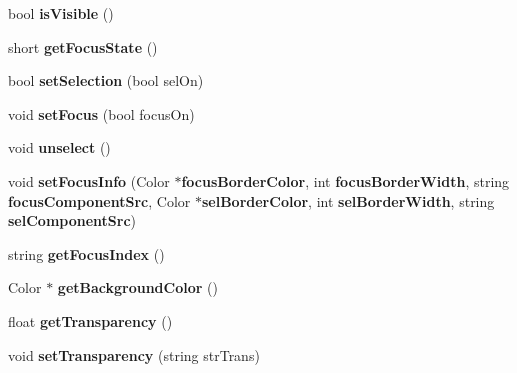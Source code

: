 \begin{CompactItemize}
\item 
bool \textbf{isVisible} ()\label{classbr_1_1pucrio_1_1telemidia_1_1ginga_1_1ncl_1_1model_1_1presentation_1_1FormatterRegion_adc2f7e6c414e3e7016fb654293daa7f}

\item 
short \textbf{getFocusState} ()\label{classbr_1_1pucrio_1_1telemidia_1_1ginga_1_1ncl_1_1model_1_1presentation_1_1FormatterRegion_53328fb1d237cc01426d21b6c5277393}

\item 
bool \textbf{setSelection} (bool selOn)\label{classbr_1_1pucrio_1_1telemidia_1_1ginga_1_1ncl_1_1model_1_1presentation_1_1FormatterRegion_5c5e79e1b8e9e273ca4eb02b4528e4b7}

\item 
void \textbf{setFocus} (bool focusOn)\label{classbr_1_1pucrio_1_1telemidia_1_1ginga_1_1ncl_1_1model_1_1presentation_1_1FormatterRegion_ad9eb97a49cdb3e8a69c4163d19215e3}

\item 
void \textbf{unselect} ()\label{classbr_1_1pucrio_1_1telemidia_1_1ginga_1_1ncl_1_1model_1_1presentation_1_1FormatterRegion_807567de9075f77c2c3abd77c4eb32ba}

\item 
void \textbf{setFocusInfo} (Color $\ast${\bf focusBorderColor}, int {\bf focusBorderWidth}, string {\bf focusComponentSrc}, Color $\ast${\bf selBorderColor}, int {\bf selBorderWidth}, string {\bf selComponentSrc})\label{classbr_1_1pucrio_1_1telemidia_1_1ginga_1_1ncl_1_1model_1_1presentation_1_1FormatterRegion_a6d52076e13cdb768658de0cd53a8526}

\item 
string \textbf{getFocusIndex} ()\label{classbr_1_1pucrio_1_1telemidia_1_1ginga_1_1ncl_1_1model_1_1presentation_1_1FormatterRegion_bb02007af3c039562d3352ff94e8decf}

\item 
Color $\ast$ \textbf{getBackgroundColor} ()\label{classbr_1_1pucrio_1_1telemidia_1_1ginga_1_1ncl_1_1model_1_1presentation_1_1FormatterRegion_bcb0b09962be0a2d15b855b5540ab9ac}

\item 
float \textbf{getTransparency} ()\label{classbr_1_1pucrio_1_1telemidia_1_1ginga_1_1ncl_1_1model_1_1presentation_1_1FormatterRegion_c2a276d1e30b0f02c3aedb8a465c48a9}

\item 
void \textbf{setTransparency} (string strTrans)\label{classbr_1_1pucrio_1_1telemidia_1_1ginga_1_1ncl_1_1model_1_1presentation_1_1FormatterRegion_9dbab1f4c5ac2589b3b100fe98f56038}


\end{CompactItemize}
